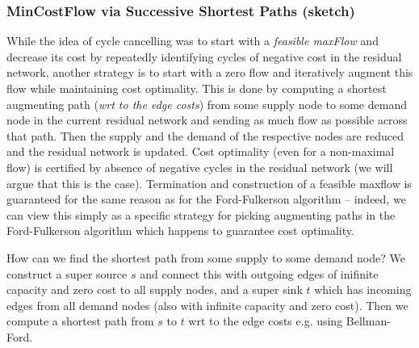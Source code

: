 \documentclass{article}
\begin{document}
\subsubsection{MinCostFlow via Successive Shortest Paths (sketch)}
While the idea of cycle cancelling was to start with a \emph{feasible maxFlow} and decrease its cost by repeatedly identifying cycles of negative cost in the residual network, another strategy is to start with a zero flow and iteratively augment this flow while maintaining cost optimality. This is done by computing a  shortest augmenting path (\emph{wrt to the edge costs}) from some supply node to some demand node in the current residual network and sending as much flow as possible across that path. Then the supply and the demand of the respective nodes are reduced and the residual network is updated.
 Cost optimality (even for a non-maximal flow) is certified by absence of negative cycles in the residual network (we will argue that this is the case). Termination and construction of a feasible maxflow is guaranteed for the same reason as for the Ford-Fulkerson algorithm -- indeed, we can view this simply as a specific strategy for picking augmenting paths in the Ford-Fulkerson algorithm which happens to guarantee cost optimality.
 
How can we find the shortest path from some supply to some demand node? We construct a super source $s$ and connect this with outgoing edges of inifinite capacity and zero cost to all supply nodes, and a super sink $t$ which has incoming edges from all demand nodes (also with infinite capacity and zero cost). Then we compute a shortest path from $s$ to $t$ wrt to the edge costs e.g. using Bellman-Ford. 
\end{document}
